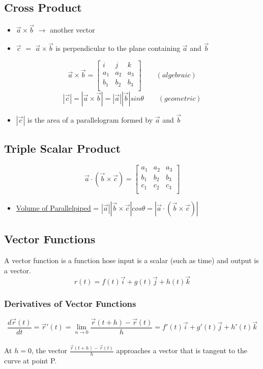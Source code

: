 \documentclass[11pt]{article}
\begin{document}
\subsection{Cross Product}
\begin{itemize}
\item $\vec{a} \times \vec{b} $ $\rightarrow$ another vector
\item $\vec{c}$ $=$ $\vec{a} \times \vec{b}$ is perpendicular to the plane containing $\vec{a}$ and $\vec{b}$
\end{itemize}
$$
\vec{a}\times \vec{b} = 
\begin{bmatrix}
i&j&k \\
a_1&a_2&a_3 \\
b_1&b_2&b_3 \\
\end{bmatrix}
\quad \quad
(algebraic)
$$
\smallskip
$$
|\vec{c}| = |\vec{a}\times \vec{b}| = |\vec{a}||\vec{b}|sin\theta \quad \quad (geometric)
$$
\begin{itemize}
\item $|\vec{c}|$ is the area of a parallelogram formed by $\vec{a}$ and $\vec{b}$
\end{itemize}
\subsection{Triple Scalar Product}
$$
\vec{a} \cdot (\vec{b} \times \vec{c}) = 
\begin{bmatrix}
a_1&a_2&a_3 \\
b_1&b_2&b_3 \\
c_1&c_2&c_3 \\
\end{bmatrix}
$$
\begin{itemize}
\item \underline{Volume of Parallelpiped} = $ |\vec{a}||\vec{b} \times \vec{c}|cos\theta = |\vec{a} \cdot (\vec{b} \times \vec{c})|$
\end{itemize}
\subsection{Vector Functions}
A vector function is a function hose input is a scalar (such as time) and output is a vector.
$$
r(t) = f(t)\vec{i} + g(t)\vec{j} + h(t)\vec{k}
$$
\subsubsection{Derivatives of Vector Functions}
\smallskip
$$
\frac{d\vec{r}(t)}{dt} = \vec{r}'(t) = \lim_{n\to0} \frac{\vec{r}(t+h)-\vec{r}(t)}{h} = f'(t)\vec{i} + g'(t)\vec{j} + h'(t)\vec{k}
$$
\\
At $h=0$, the vector $\frac{\vec{r}(t+h)-\vec{r}(t)}{h}$ approaches a vector that is tangent to the curve at point P.
\end{document}
